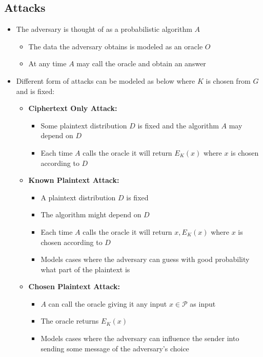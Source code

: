 \subsection{Attacks}
\begin{itemize}
  \item The adversary is thought of as a probabilistic algorithm $A$
  \begin{itemize}
  	\item The data the adversary obtains is modeled as an oracle $O$
  	\item At any time $A$ may call the oracle and obtain an answer
  \end{itemize}

  \item Different form of attacks can be modeled as below where $K$ is chosen from $G$ and is fixed:
  \begin{itemize}
  	\item \textbf{Ciphertext Only Attack:}
    \begin{itemize}
  		\item Some plaintext distribution $D$ is fixed and the algorithm $A$ may depend on $D$
  		\item Each time $A$ calls the oracle it will return $E_K(x)$ where $x$ is chosen according to $D$
    \end{itemize}
  	\item \textbf{Known Plaintext Attack:}
    \begin{itemize}
  		\item A plaintext distribution $D$ is fixed
  		\item The algorithm might depend on $D$
  		\item Each time $A$ calls the oracle it will return $x, E_K(x)$ where $x$ is chosen according to $D$
  		\item Models cases where the adversary can guess with good probability what part of the plaintext is
    \end{itemize}
  	\item \textbf{Chosen Plaintext Attack:}
    \begin{itemize}
  		\item $A$ can call the oracle giving it any input $x \in \mathcal P$ as input
  		\item The oracle returns $E_K(x)$
  		\item Models cases where the adversary can influence the sender into sending some message of the adversary's choice
    \end{itemize}

\end{itemize}
\end{itemize}
